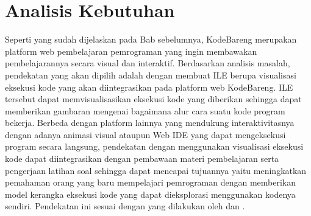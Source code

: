 


\section{Analisis Kebutuhan} \label{sec:analisis-kebutuhan}
Seperti yang sudah dijelaskan pada Bab sebelumnya, KodeBareng merupakan platform web pembelajaran pemrograman yang ingin membawakan pembelajarannya secara visual dan interaktif. Berdasarkan analisis masalah, pendekatan yang akan dipilih adalah dengan membuat ILE berupa visualisasi eksekusi kode yang akan diintegrasikan pada platform web KodeBareng. ILE tersebut dapat memvisualisasikan eksekusi kode yang diberikan sehingga dapat memberikan gambaran mengenai bagaimana alur cara suatu kode program bekerja. Berbeda dengan platform lainnya yang mendukung interaktivitasnya dengan adanya animasi visual ataupun Web IDE yang dapat mengeksekusi program secara langsung, pendekatan dengan menggunakan visualisasi eksekusi kode dapat diintegrasikan dengan pembawaan materi pembelajaran serta pengerjaan latihan soal sehingga dapat mencapai tujuannya yaitu meningkatkan pemahaman orang yang baru mempelajari pemrograman dengan memberikan model kerangka eksekusi kode yang dapat dieksplorasi menggunakan kodenya sendiri. Pendekatan ini sesuai dengan yang dilakukan oleh \textcite{moons2013pilot} dan \textcite{mayer1981psychology}.

